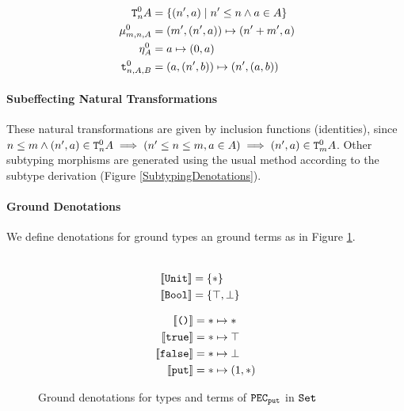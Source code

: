     \begin{align}
        \label{AdequacyGradedMonad}
        \texttt{T}^0_{n}A & = \{(n', a) \mid n'\leq n\wedge a\in A \}\\
        \mu_{m, n, A}^0 & = (m', (n', a))\mapsto (n' + m', a)\\
        \eta_{A}^0 & = a\mapsto (0, a)\\\
        \texttt{t}_{n, A, B}^0 & = (a, (n', b)) \mapsto (n', (a, b))
    \end{align}


\paragraph{Subeffecting Natural Transformations}
These natural transformations are given by inclusion functions (identities), since $n\leq m\wedge (n',a)\in\texttt{T}^0_{n}A \implies (n'\leq n \leq m, a\in A)\implies (n',a)\in\texttt{T}^0_{m}A$. Other subtyping morphisms are generated using the usual method according to the subtype derivation (Figure \ref{SubtypingDenotations}).

\paragraph{Ground Denotations}
We define denotations for ground types an ground terms as in Figure \ref{PECPUTGroundDenotations}.

\begin{figure}[H]
    \centering
    \begin{minipage}{0.45\linewidth}
        \begin{framed}
            \begin{align*}
                \\
                {\bf [\![}\texttt{Unit}{\bf ]\!]} & = \{\ast\}\\
                {\bf [\![}\texttt{Bool}{\bf ]\!]} & = \{\top, \bot\}\\
            \end{align*}
        \end{framed}
    \end{minipage}
    \quad
    \begin{minipage}{0.45\linewidth}
        \begin{framed}
            
\begin{align*}
    \deno{\u} & = \singleton\mapsto \singleton\\
    \deno{\t} & = \singleton\mapsto \top\\
    \deno{\f} & = \singleton\mapsto \bot\\
    \deno{\put} & = \singleton\mapsto (1, \singleton)
\end{align*}

        \end{framed}
    \end{minipage}
    
    \caption{Ground denotations for types and terms of $\texttt{PEC}_{\texttt{put}}$ in $\texttt{Set}$}
    \label{PECPUTGroundDenotations}
\end{figure}





